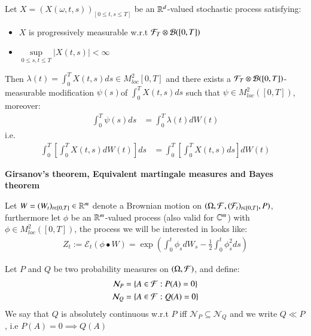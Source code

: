 \begin{theorem}
\label{thm: Stochastic_Fubini}
Let $X = (X(\omega, t, s))_{[0\leq t,s\leq T]}$ be an $\mathbb{R}^{d}$-valued stochastic process satisfying: 
\begin{itemize}[leftmargin=*]
    \item $X$ is progressively measurable w.r.t $\mathcal{F}_{T}\otimes \mathcal{B}([0,T])$ 
    \item $\sup\limits_{0 \leq s,t\leq T}|{X(t,s)}| < \infty$
\end{itemize}
Then $\lambda(t) = \int_{0}^{T}X(t,s)ds \in M^{2}_{loc}[0,T]$ and there exists a $\mathcal{F}_{T}\otimes \mathcal{B}([0,T])$-measurable modification $\psi(s)$of $\int_{0}^{T}X(t,s)ds $ such that $\psi \in M^{2}_{loc}([0,T])$, moreover: 
\begin{align*}
\int_{0}^{T}\psi(s)ds &= \int_{0}^{T}\lambda(t)dW(t)    
\end{align*}
i.e. 
\begin{align*}
\int_{0}^{T}\left[
\int_{0}^{T}X(t,s)dW(t)
\right]ds 
&= 
\int_{0}^{T}\left[
\int_{0}^{T}X(t,s)ds
\right]dW(t) 
\end{align*}
\end{theorem}

\newpage 
\centerline{\textbf{Girsanov's theorem, Equivalent martingale measures and Bayes theorem}}
\text{}\newline
Let $W = (W_{t})_{t\in [0,T]} \in \mathbb{R}^{m}$ denote a Brownian motion on $(\Omega, \mathcal{F}, (\mathcal{F}_{t})_{t\in [0,T]}, P)$, furthermore let $\phi$ be an $\mathbb{R}^{m}$-valued process (also valid for $\mathbb{C}^{m}$) with \\
$\phi \in M^{2}_{loc}([0,T])$, the process we will be interested in looks like: 
\begin{align}
\label{eq: Dodeans_exponential}
Z_{t} := \mathcal{E}_{t}\left(
\phi \bullet W
\right) =
\exp\left(
\int_{0}^{t}\phi_{s}dW_{s} - \frac{1}{2}\int_{0}^{t}\phi_{s}^{2}ds
\right)
\end{align}

\begin{definition}
\label{def: absolutely_cont_measures}
Let $P$ and $Q$ be two probability measures on $(\Omega, \mathcal{F})$, and define: 
\begin{align*}
\mathcal{N}_{P} &= \{A \in \mathcal{F}: P(A) = 0\} \\ 
\mathcal{N}_{Q} &= \{A \in \mathcal{F}: Q(A) = 0\} 
\end{align*} 
We say that $Q$ is absolutely continuous w.r.t $P$ iff $\mathcal{N}_{P} \subseteq \mathcal{N}_{Q}$ and we write $Q \ll P$, i.e $P(A) = 0 \implies Q(A)$
\end{definition}

